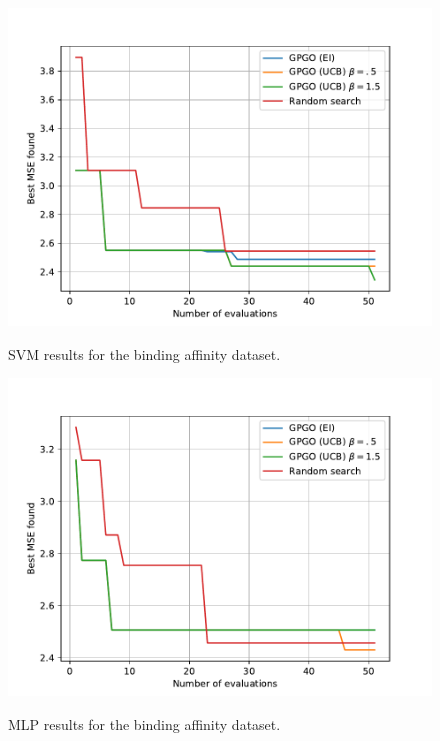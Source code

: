 \documentclass[10pt,a4paper,twoside]{book}
\begin{document}
\begin{figure}
\centering
\caption{SVM results for the binding affinity dataset.}
\includegraphics[scale=0.75]{figures/chapter4/aff/svm}
\label{fig:affsvm}
\end{figure}

\begin{figure}
\centering
\caption{MLP results for the binding affinity dataset.}
\includegraphics[scale=0.75]{figures/chapter4/aff/mlp}
\label{fig:affmlp}
\end{figure}
\end{document}
